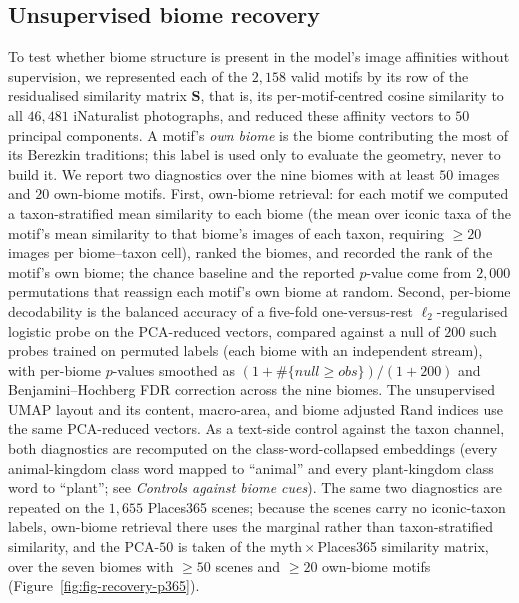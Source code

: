 \documentclass[11pt,a4paper]{article}
\begin{document}
\subsection*{Unsupervised biome recovery}

To test whether biome structure is present in the model's image
affinities without supervision, we represented each of the
$2{,}158$ valid motifs by its row of the residualised similarity
matrix $\mathbf{S}$, that is, its per-motif-centred cosine
similarity to all $46{,}481$ iNaturalist photographs, and reduced
these affinity vectors to $50$ principal components. A motif's
\emph{own biome} is the biome contributing the most of its Berezkin
traditions; this label is used only to evaluate the geometry, never
to build it. We report two diagnostics over the nine biomes with
at least $50$ images and $20$ own-biome motifs. First, own-biome
retrieval: for each motif we computed a taxon-stratified mean
similarity to each biome (the mean over iconic taxa of the motif's
mean similarity to that biome's images of each taxon, requiring
$\geq 20$ images per biome--taxon cell), ranked the biomes, and
recorded the rank of the motif's own biome; the chance baseline and
the reported $p$-value come from $2{,}000$ permutations that
reassign each motif's own biome at random. Second, per-biome
decodability is the balanced accuracy of a five-fold
one-versus-rest $\ell_2$-regularised logistic probe on the
PCA-reduced vectors, compared against a null of $200$ such probes
trained on permuted labels (each biome with an independent stream),
with per-biome $p$-values smoothed as
$(1+\#\{null\geq obs\})/(1+200)$ and Benjamini--Hochberg FDR
correction across the nine biomes. The unsupervised UMAP layout and its
content, macro-area, and biome adjusted Rand indices use the same
PCA-reduced vectors. As a text-side control against the taxon
channel, both diagnostics are recomputed on the class-word-collapsed
embeddings (every animal-kingdom class word mapped to ``animal'' and
every plant-kingdom class word to ``plant''; see \emph{Controls
against biome cues}). The same two diagnostics are repeated on the
$1{,}655$ Places365 scenes; because the scenes carry no iconic-taxon
labels, own-biome retrieval there uses the marginal rather than
taxon-stratified similarity, and the PCA-$50$ is taken of the
myth\,$\times$\,Places365 similarity matrix, over the seven biomes
with $\geq 50$ scenes and $\geq 20$ own-biome motifs
(Figure~\ref{fig:fig-recovery-p365}).

\end{document}
